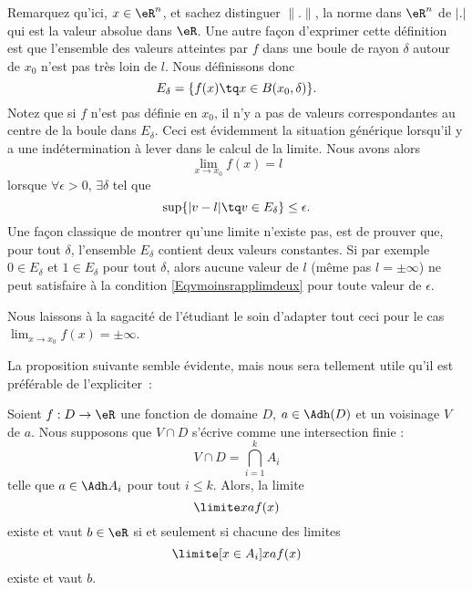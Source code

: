 Remarquez qu'ici, \( x\in\eR^n\), et sachez distinguer \( \| . \|\), la norme dans \( \eR^n\) de \( | . |\) qui est la valeur absolue dans \( \eR\). Une autre façon d'exprimer cette définition est que l'ensemble des valeurs atteintes par \( f\) dans une boule de rayon \( \delta\) autour de \( x_0\) n'est pas très loin de \( l\). Nous définissons donc
\begin{equation}
	E_{\delta}=\{ f(x)\tq x\in B(x_0,\delta) \}.
\end{equation}
Notez que si \( f\) n'est pas définie en \( x_0\), il n'y a pas de valeurs correspondantes au centre de la boule dans \( E_{\delta}\). Ceci est évidemment la situation générique lorsqu'il y a une indétermination à lever dans le calcul de la limite. Nous avons alors
\begin{equation}
	\lim_{x\to x_0}f(x)=l
\end{equation}
lorsque \( \forall\epsilon>0\), \( \exists\delta\) tel que
\begin{equation}        \label{Eqvmoinsrapplimdeux}
	\sup\{ | v-l |\tq v\in E_{\delta} \}\leq\epsilon.
\end{equation}
Une façon classique de montrer qu'une limite n'existe pas, est de prouver que, pour tout \( \delta\), l'ensemble \( E_{\delta}\) contient deux valeurs constantes. Si par exemple \( 0\in E_{\delta}\) et \( 1\in E_{\delta}\) pour tout \( \delta\), alors aucune valeur de \( l\) (même pas \( l=\pm\infty\)) ne peut satisfaire à la condition \eqref{Eqvmoinsrapplimdeux} pour toute valeur de \( \epsilon\).

Nous laissons à la sagacité de l'étudiant le soin d'adapter tout ceci pour le cas \( \lim_{x\to x_0}f(x)=\pm\infty\).

La proposition suivante semble évidente, mais nous sera tellement
utile qu'il est préférable de l'expliciter~:
\begin{proposition}     \label{PROPooPOAQooPmxEtb}
	Soient \( f : D \to \eR\) une fonction de domaine \( D\), \( a\in\Adh(D)\) et un voisinage \( V\) de \( a\). Nous supposons que \( V\cap D\) s'écrive comme une intersection finie :
	\begin{equation*}
		V\cap D = \bigcap_{i=1}^k A_i
	\end{equation*}
	telle que \( a \in \Adh A_i\) pour tout \( i \leq k\). Alors, la limite
	\begin{equation}      \label{EQooEXELooHccCGw}
		\limite x a f(x)
	\end{equation}
	existe et vaut \( b\in \eR\) si et seulement si chacune des limites
	\begin{equation}
		\limite[x \in A_i] x a f(x)
	\end{equation}
	existe et vaut \( b\).
\end{proposition}

